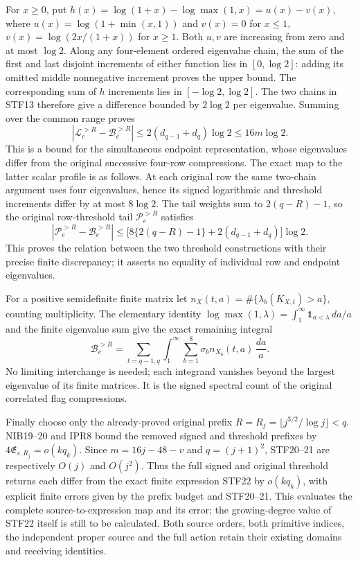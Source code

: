\documentclass[11pt,a4paper]{article}
\begin{document}
For $x\ge0$, put $h(x)=\log(1+x)-\log\max(1,x)=u(x)-v(x)$,
where
$u(x)=\log(1+\min(x,1))$ and $v(x)=0$ for $x\le1$,
$v(x)=\log(2x/(1+x))$ for $x\ge1$.
Both $u,v$ are increasing from zero and at most $\log2$.
Along any four-element ordered eigenvalue chain, the sum of the first
and last disjoint increments of either function lies in $[0,\log2]$:
adding its omitted middle nonnegative increment proves the upper bound.
The corresponding sum of $h$ increments lies in $[-\log2,\log2]$.
The two chains in STF13 therefore give a difference bounded by
$2\log2$ per eigenvalue. Summing over the common range proves
\[
 |\mathcal L_e^{>R}-\mathcal B_e^{>R}|
             \le2(d_{q-1}+d_q)\log2\le16m\log2.         \tag{STF20}
\]
This is a bound for the simultaneous endpoint representation, whose
eigenvalues differ from the original successive four-row compressions.
The exact map to the latter scalar profile is as follows. At each
original row the same two-chain argument uses four eigenvalues, hence
its signed logarithmic and threshold increments differ by at most
$8\log2$. The tail weights sum to $2(q-R)-1$, so the original
row-threshold tail $\mathcal P_e^{>R}$ satisfies
\[
 |\mathcal P_e^{>R}-\mathcal B_e^{>R}|
 \le\bigl[8\{2(q-R)-1\}+2(d_{q-1}+d_q)\bigr]\log2.      \tag{STF21}
\]
This proves the relation between the two threshold constructions with
their precise finite discrepancy; it asserts no equality of individual
row and endpoint eigenvalues.

For a positive semidefinite finite matrix let
$n_X(t,a)=\#\{\lambda_b(K_{X,t})>a\}$, counting multiplicity.
The elementary identity
$\log\max(1,\lambda)=\int_1^\infty\mathbf1_{a<\lambda}\,da/a$
and the finite eigenvalue sum give the exact remaining integral
\[
 \mathcal B_e^{>R}
   =\sum_{t=q-1,q}\int_1^\infty
                    \sum_{b=1}^8\sigma_b n_{X_b}(t,a)\,\frac{da}{a}. \tag{STF22}
\]
No limiting interchange is needed; each integrand vanishes beyond
the largest eigenvalue of its finite matrices. It is the signed
spectral count of the original correlated flag compressions.

Finally choose only the already-proved original prefix
$R=R_j=\lfloor j^{3/2}/\log j\rfloor<q$.
NIB19--20 and IPR8 bound the removed signed and threshold prefixes
by $4\mathfrak E_{s,R_j}=o(kq_k)$. Since $m=16j-48-v$ and
$q=(j+1)^2$, STF20--21 are respectively $O(j)$ and $O(j^2)$.
Thus the full signed and original threshold returns each differ
from the exact finite expression STF22 by $o(kq_k)$, with explicit
finite errors given by the prefix budget and STF20--21. This evaluates
the complete source-to-expression map and its error; the growing-degree
value of STF22 itself is still to be calculated. Both source orders,
both primitive indices, the independent proper source and the full
action retain their existing domains and receiving identities.
\endgroup
\end{document}
